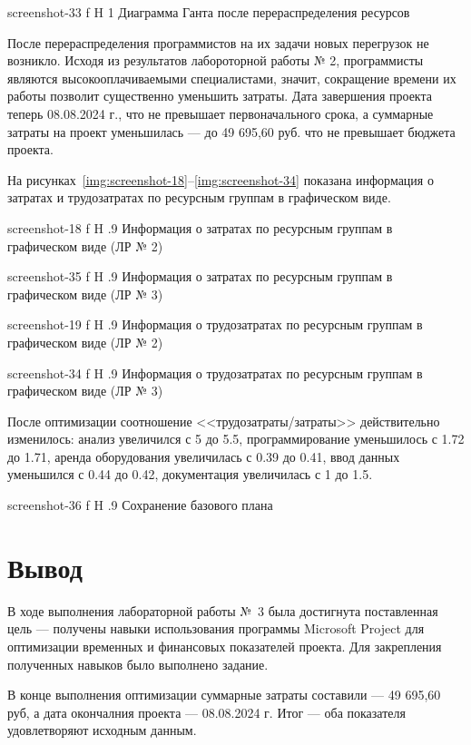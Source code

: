\documentclass{bmstu}
\begin{document}
    {screenshot-33}
    {f}
    {H}
    {1\textwidth}
    {Диаграмма Ганта после перераспределения ресурсов}

После перераспределения программистов на их задачи новых перегрузок не возникло. 
Исходя из результатов лабороторной работы № 2, программисты являются высокооплачиваемыми специалистами, значит, сокращение времени их работы позволит существенно уменьшить затраты. 
Дата завершения проекта теперь 08.08.2024 г., что не превышает первоначального срока, а суммарные затраты на проект уменьшилась --- до 49 695,60 руб. что не превышает бюджета проекта.

На рисунках~\ref{img:screenshot-18}--\ref{img:screenshot-34} показана информация о затратах и трудозатратах по ресурсным группам в графическом виде.

    {screenshot-18}
    {f}
    {H}
    {.9\textwidth}
    {Информация о затратах по ресурсным группам в графическом виде (ЛР № 2)}

    {screenshot-35}
    {f}
    {H}
    {.9\textwidth}
    {Информация о затратах по ресурсным группам в графическом виде (ЛР № 3)}

    {screenshot-19}
    {f}
    {H}
    {.9\textwidth}
    {Информация о трудозатратах по ресурсным группам в графическом виде (ЛР № 2)}

    {screenshot-34}
    {f}
    {H}
    {.9\textwidth}
    {Информация о трудозатратах по ресурсным группам в графическом виде (ЛР № 3)}

После оптимизации соотношение <<трудозатраты/затраты>> действительно изменилось: анализ увеличился с 5 до 5.5, программирование уменьшилось с 1.72 до 1.71, аренда оборудования увеличилась с 0.39 до 0.41, ввод данных уменьшился с 0.44 до 0.42, документация увеличилась с 1 до 1.5.

    {screenshot-36}
    {f}
    {H}
    {.9\textwidth}
    {Сохранение базового плана}

\section{Вывод}

В ходе выполнения лабораторной работы №~3 была достигнута поставленная цель --- получены навыки использования программы Microsoft Project для оптимизации временных и финансовых показателей проекта. 
Для закрепления полученных навыков было выполнено задание.

В конце выполнения оптимизации суммарные затраты составили --- 49 695,60 руб, а дата окончалния проекта --- 08.08.2024 г. 
Итог --- оба показателя удовлетворяют исходным данным.
\end{document}

